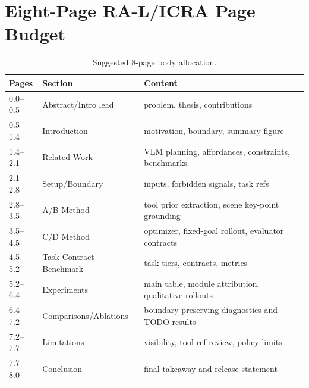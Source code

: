\documentclass[journal]{IEEEtran}
\begin{document}
\section{Eight-Page RA-L/ICRA Page Budget}
\begin{table}[t]
\centering
\caption{Suggested 8-page body allocation.}
\begin{tabular}{p{}p{}p{}}
\toprule
Pages & Section & Content \\
\midrule
0.0--0.5 & Abstract/Intro lead & problem, thesis, contributions \\
0.5--1.4 & Introduction & motivation, boundary, summary figure \\
1.4--2.1 & Related Work & VLM planning, affordances, constraints, benchmarks \\
2.1--2.8 & Setup/Boundary & inputs, forbidden signals, task refs \\
2.8--3.5 & A/B Method & tool prior extraction, scene key-point grounding \\
3.5--4.5 & C/D Method & optimizer, fixed-goal rollout, evaluator contracts \\
4.5--5.2 & Task-Contract Benchmark & task tiers, contracts, metrics \\
5.2--6.4 & Experiments & main table, module attribution, qualitative rollouts \\
6.4--7.2 & Comparisons/Ablations & boundary-preserving diagnostics and TODO results \\
7.2--7.7 & Limitations & visibility, tool-ref review, policy limits \\
7.7--8.0 & Conclusion & final takeaway and release statement \\
\bottomrule
\end{tabular}
\end{table}



\end{document}
